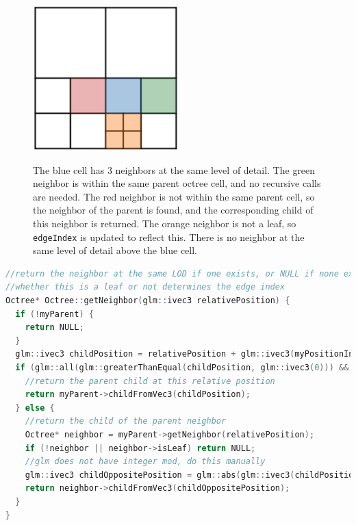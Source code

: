 \documentclass[11pt]{article}
\begin{document}
\begin{figure}
  \caption{The blue cell has 3 neighbors at the same level of detail. The green neighbor is within the same parent octree cell, and no recursive calls are needed. The red neighbor is not within the same parent cell, so the neighbor of the parent is found, and the corresponding child of this neighbor is returned. The orange neighbor is not a leaf, so \texttt{edgeIndex} is updated to reflect this. There is no neighbor at the same level of detail above the blue cell.}
  \includegraphics[width=0.5\textwidth]{octree_neighbors.png}
  \label{fig:octree_neighbors}
\end{figure}

\pagebreak

\begin{lstlisting}[language=C++,label={octree_neighbor},caption={Code for finding the neighbor of a node at the same level of detail in an octree. The children of a node are stored as a 3D array of pointers: \texttt{Octree* myChildren[2][2][2];}. \texttt{relativePosition} is a 3-component vector, where exactly one component is non-zero, corresponding to the direction in which to look for the neighbor. For example, a value of $\left(1,0,0\right)$ searches in the positive X direction.}]
//return the neighbor at the same LOD if one exists, or NULL if none exists
//whether this is a leaf or not determines the edge index
Octree* Octree::getNeighbor(glm::ivec3 relativePosition) {
  if (!myParent) {
    return NULL;
  }
  glm::ivec3 childPosition = relativePosition + glm::ivec3(myPositionInParent);
  if (glm::all(glm::greaterThanEqual(childPosition, glm::ivec3(0))) && glm::all(glm::lessThanEqual(childPosition,glm::ivec3(1)))) {
    //return the parent child at this relative position
    return myParent->childFromVec3(childPosition);
  } else {
    //return the child of the parent neighbor
    Octree* neighbor = myParent->getNeighbor(relativePosition);
    if (!neighbor || neighbor->isLeaf) return NULL;
    //glm does not have integer mod, do this manually
    glm::ivec3 childOppositePosition = glm::abs(glm::ivec3(childPosition.x % 2, childPosition.y % 2, childPosition.z % 2));
    return neighbor->childFromVec3(childOppositePosition);
  }
}
\end{lstlisting}
\end{document}
